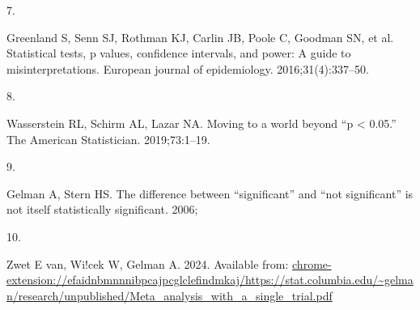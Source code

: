 \documentclass[
  letterpaper,
  DIV=11,
  numbers=noendperiod]{scrartcl}
\newlength{\cslhangindent}
\newlength{\csllabelwidth}
\newenvironment{CSLReferences}[2] %
 {\begin{list}{}{%
  \setlength{\itemindent}{0pt}
  \setlength{\leftmargin}{0pt}
  \setlength{\parsep}{0pt}
  \ifodd #1
   \setlength{\leftmargin}{\cslhangindent}
   \setlength{\itemindent}{-1\cslhangindent}
  \fi
  \setlength{\itemsep}{#2\baselineskip}}}
 {\end{list}}
\newcommand{\CSLLeftMargin}[1]{\parbox[t]{\csllabelwidth}{\strut#1\strut}}
\newcommand{\CSLRightInline}[1]{\parbox[t]{\linewidth - \csllabelwidth}{\strut#1\strut}}
\begin{document}
\begin{CSLReferences}{0}{1}
\CSLLeftMargin{7. }%
\CSLRightInline{Greenland S, Senn SJ, Rothman KJ, Carlin JB, Poole C,
Goodman SN, et al. Statistical tests, p values, confidence intervals,
and power: A guide to misinterpretations. European journal of
epidemiology. 2016;31(4):337--50. }

\CSLLeftMargin{8. }%
\CSLRightInline{Wasserstein RL, Schirm AL, Lazar NA. Moving to a world
beyond {``p \textless{} 0.05.''} The American Statistician.
2019;73:1--19. }

\CSLLeftMargin{9. }%
\CSLRightInline{Gelman A, Stern HS. The difference between
{``significant''} and {``not significant''} is not itself statistically
significant. 2006; }

\CSLLeftMargin{10. }%
\CSLRightInline{Zwet E van, Wi!cek W, Gelman A. 2024. Available from:
\url{chrome-extension://efaidnbmnnnibpcajpcglclefindmkaj/https://stat.columbia.edu/~gelman/research/unpublished/Meta_analysis_with_a_single_trial.pdf}}

\end{CSLReferences}
\end{document}

